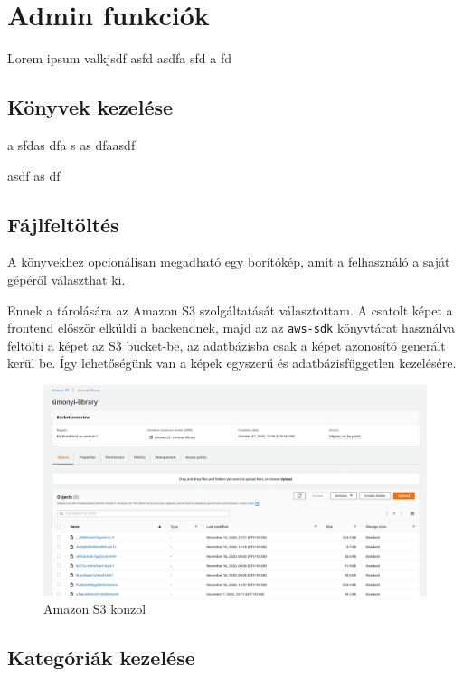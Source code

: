 \section{Admin funkciók}

Lorem ipsum valkjsdf
asfd
asdfa
sfd
a
fd

\subsection{Könyvek kezelése}
a
sfdas
dfa
s
as
dfaasdf



asdf
as
df


\subsection{Fájlfeltöltés}

A könyvekhez opcionálisan megadható egy borítókép, amit a felhasználó a saját gépéről választhat ki.

Ennek a tárolására az Amazon S3 szolgáltatását választottam. A csatolt képet a frontend először elküldi a backendnek,
majd az az \lstinline|aws-sdk| könyvtárat használva feltölti a képet az S3 bucket-be, az adatbázisba csak a képet
azonosító generált kerül be. Így lehetőségünk van a képek egyszerű és adatbázisfüggetlen kezelésére.

\begin{figure}[!ht]
  \centering
  \includegraphics[width=150mm, keepaspectratio]{figures/s3-dashboard.png}
  \caption{Amazon S3 konzol}
  \label{fig:S3Console}
\end{figure}

\subsection{Kategóriák kezelése}

